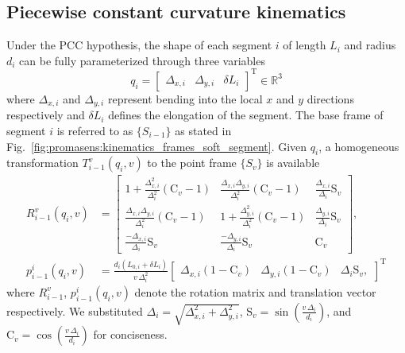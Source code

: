 \subsection{Piecewise constant curvature kinematics}\label{sub:promasens:kinematic_model_pcc}

Under the \gls{PCC} hypothesis, the shape of each segment $i$ of length $L_{i}$ and radius $d_i$ can be fully parameterized through three variables
\begin{equation}
    q_i = \begin{bmatrix}\Delta_{x,i} & \Delta_{y,i} & \delta L_{i} \end{bmatrix}^{\mathrm{T}} \in \mathbb{R}^3
\end{equation}
where $\Delta_{x,i}$ and $\Delta_{y,i}$ represent bending into the local $x$ and $y$ directions respectively and $\delta L_i$ defines the elongation of the segment.
The base frame of segment $i$ is referred to as $\{S_{i-1}\}$ as stated in Fig.~\ref{fig:promasens:kinematics_frames_soft_segment}. Given $q_i$, a homogeneous transformation $T_{i-1}^{v}(q_i, v)$ to the point frame $\{S_{v}\}$ is available
\begin{equation}
\label{eq:promasens:transform_improved_q}
\begin{split}
    R_{i-1}^{v}(q_i,v) &=
    \begin{bmatrix}
        1 + \frac{\Delta_{x,i}^2}{\Delta_{i}^2} \left ( \mathrm{C}_v - 1 \right ) & \frac{\Delta_{x,i} \Delta_{y,i}}{\Delta_{i}^2} \left ( \mathrm{C}_v - 1 \right ) & \frac{\Delta_{x,i}}{\Delta_i} \mathrm{S}_v\\
        \frac{\Delta_{x,i} \Delta_{y,i}}{\Delta_{i}^2} \left ( \mathrm{C}_v - 1 \right ) & 1 + \frac{\Delta_{y,i}^2}{\Delta_{i}^2} \left ( \mathrm{C}_v - 1 \right ) & \frac{\Delta_{y,i}}{\Delta_i} \mathrm{S}_v\\
        \frac{-\Delta_{x,i}}{\Delta_i} \mathrm{S}_v & \frac{-\Delta_{y,i}}{\Delta_i} \mathrm{S}_v & \mathrm{C}_v
    \end{bmatrix},\\
    p_{i-1}^{i}(q_i,v) &= \frac{d_i ( L_{0,i}+\delta L_i)}{v \, \Delta_i^2}
    \begin{bmatrix}
        \Delta_{x,i} (1 - \mathrm{C}_v) & \Delta_{y,i} (1 - \mathrm{C}_v) & \Delta_{i} \mathrm{S}_v,
    \end{bmatrix}^{\mathrm{T}}
\end{split}
\end{equation}
where $R_{i-1}^{v}$, $p_{i-1}^{i}(q_i,v)$ denote the rotation matrix and translation vector respectively. We substituted $\Delta_i = \sqrt{\Delta_{x,i}^2 + \Delta_{y,i}^2}$, $\mathrm{S}_v = \sin \left (\frac{v \, \Delta_i}{d_i} \right )$, and $\mathrm{C}_v = \cos \left ( \frac{v \, \Delta_i}{d_i} \right )$ for conciseness.

